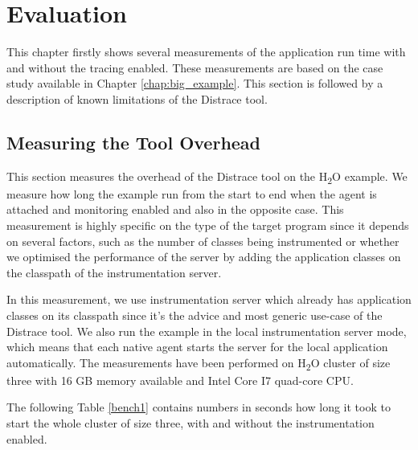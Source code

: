 \chapter{Evaluation}
\label{chap:evaluation}
This chapter firstly shows several measurements of the application run time with and without the tracing enabled. These measurements are based on the case study available in Chapter \ref{chap:big_example}. This section is followed by a description of known limitations of the Distrace tool.

\section{Measuring the Tool Overhead}
This section measures the overhead of the Distrace tool on the H\textsubscript{2}O example. We measure how long the example run from the start to end when the agent is attached and monitoring enabled and also in the opposite case. This measurement is highly specific on the type of the target program since it depends on several factors, such as the number of classes being instrumented or whether we optimised the performance of the server by adding the application classes on the classpath of the instrumentation server.

In this measurement, we use instrumentation server which already has application classes on its classpath since it's the advice and most generic use-case of the Distrace tool. We also run the example in the local instrumentation server mode, which means that each native agent starts the server for the local application automatically. The measurements have been performed on H\textsubscript{2}O cluster of size three with 16 GB memory available and Intel Core I7 quad-core CPU.

The following Table \ref{bench1} contains numbers in seconds how long it took to start the whole cluster of size three, with and without the instrumentation enabled.

